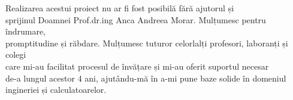 \vspace*{7cm}
\begin{center}
Realizarea acestui proiect nu ar fi fost posibilă fără ajutorul și \\
sprijinul Doamnei Prof.dr.ing Anca Andreea Morar. Mulțumesc pentru îndrumare,\\
promptitudine și răbdare. Mulțumesc tuturor celorlalți profesori, laboranți și colegi \\
care mi-au facilitat procesul de învățare și mi-au oferit suportul necesar \\
de-a lungul acestor 4 ani, ajutându-mă în a-mi pune baze solide în domeniul
ingineriei și calculatoarelor.\\
\end{center}

